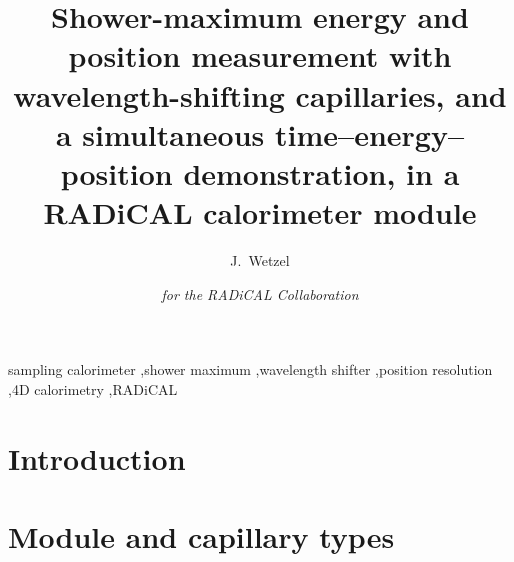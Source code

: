 \documentclass[final,5p,times,twocolumn]{elsarticle}
\begin{document}
\begin{frontmatter}

\title{Shower-maximum energy and position measurement with wavelength-shifting
capillaries, and a simultaneous time--energy--position demonstration, in a RADiCAL
calorimeter module}

\author[uiowa]{J.~Wetzel}
\author[radical]{\textit{for the RADiCAL Collaboration}}

\begin{abstract}
\end{abstract}

\begin{keyword}
sampling calorimeter \sep shower maximum \sep wavelength shifter \sep position resolution
\sep 4D calorimetry \sep RADiCAL
\end{keyword}

\end{frontmatter}

\section{Introduction}
\label{sec:intro}

\section{Module and capillary types}
\label{sec:module}
\end{document}
